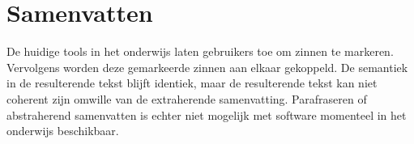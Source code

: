 \begin{table}[H]
	\centering
\end{table}

\section{Samenvatten}

De huidige tools in het onderwijs laten gebruikers toe om zinnen te markeren. Vervolgens worden deze gemarkeerde zinnen aan elkaar gekoppeld. De semantiek in de resulterende tekst blijft identiek, maar de resulterende tekst kan niet coherent zijn omwille van de extraherende samenvatting. Parafraseren of abstraherend samenvatten is echter niet mogelijk met software momenteel in het onderwijs beschikbaar. 

